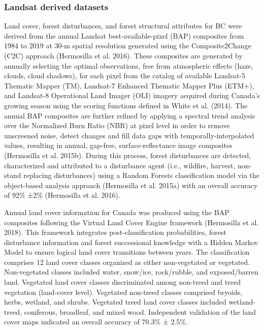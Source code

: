 \documentclass[10pt,oneside]{article}
\begin{document}
\hypertarget{landsat-derived-datasets}{%
\subsubsection{Landsat derived
datasets}\label{landsat-derived-datasets}}

Land cover, forest disturbances, and forest structural attributes for BC
were derived from the annual Landsat best-available-pixel (BAP)
composites from 1984 to 2019 at 30-m spatial resolution generated using
the Composite2Change (C2C) approach (Hermosilla et al. 2016). These
composites are generated by annually selecting the optimal observations,
free from atmospheric effects (haze, clouds, cloud shadows), for each
pixel from the catalog of available Landsat-5 Thematic Mapper (TM),
Landsat-7 Enhanced Thematic Mapper Plus (ETM+), and Landsat-8
Operational Land Imager (OLI) imagery acquired during Canada's growing
season using the scoring functions defined in White et al. (2014). The
annual BAP composites are further refined by applying a spectral trend
analysis over the Normalized Burn Ratio (NBR) at pixel level in order to
remove unscreened noise, detect changes and fill data gaps with
temporally-interpolated values, resulting in annual, gap-free,
surface-reflectance image composites (Hermosilla et al. 2015b). During
this process, forest disturbances are detected, characterized and
attributed to a disturbance agent (i.e., wildfire, harvest, non-stand
replacing disturbances) using a Random Forests classification model via
the object-based analysis approach (Hermosilla et al. 2015a) with an
overall accuracy of 92\% ±2\% (Hermosilla et al. 2016).

Annual land cover information for Canada was produced using the BAP
composites following the Virtual Land Cover Engine framework (Hermosilla
et al. 2018). This framework integrates post-classification
probabilities, forest disturbance information and forest successional
knowledge with a Hidden Markov Model to ensure logical land cover
transitions between years. The classification comprises 12 land cover
classes organized as either non-vegetated or vegetated. Non-vegetated
classes included water, snow/ice, rock/rubble, and exposed/barren land.
Vegetated land cover classes discriminated among non-treed and treed
vegetation (land-cover level). Vegetated non-treed classes comprised
bryoids, herbs, wetland, and shrubs. Vegetated treed land cover classes
included wetland-treed, coniferous, broadleaf, and mixed wood.
Independent validation of the land cover maps indicated an overall
accuracy of 70.3\% ± 2.5\%.
\end{document}
